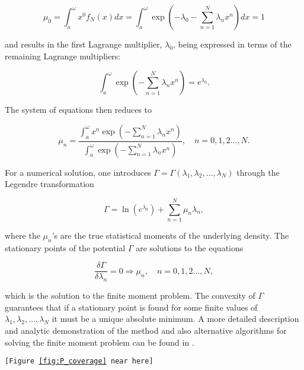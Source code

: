 \documentclass[T0_MEM]{subfiles}
\begin{document}
\begin{equation}
\mu_0 =
\int_{a}^{\omega} x^0 f_N(x) dx =
\int_{a}^{\omega} \exp\left(-\lambda_0 - \sum_{n=1}^{N} \lambda_n x^n\right) dx = 1
\end{equation}

and results in the first Lagrange multiplier, $\lambda_0$, being expressed in terms of the remaining Lagrange multipliers:

\begin{equation}
\int_{a}^{\omega} \exp\left(-\sum_{n=1}^{N} \lambda_n x^n\right) = e^{\lambda_0}.
\end{equation}

The system of equations then reduces to

\begin{equation}
\mu_n = \frac{\int_{a}^{\omega} x^n \exp\left(-\sum_{n=1}^{N} \lambda_n x^n\right)}{
\int_{a}^{\omega} \exp\left(-\sum_{n=1}^{N} \lambda_n x^n\right)},
\quad n = 0, 1, 2 \dots, N.
\end{equation}

For a numerical solution, one introduces $\Gamma = \Gamma(\lambda_1, \lambda_2, \dots, \lambda_N)$ through the Legendre transformation

\begin{equation}
\Gamma = \ln (e^{\lambda_0}) + \sum_{n=1}^{N} \mu_n \lambda_n,
\end{equation}

where the $\mu_n$'s are the true statistical moments of the underlying density. The stationary points of the potential $\Gamma$ are solutions to the equations

\begin{equation}
\frac{\delta\Gamma}{\delta\lambda_n} = 0 \Longrightarrow \mu_n , \quad n = 0, 1, 2 \dots, N,
\end{equation}

which is the solution to the finite moment problem. The convexity of $\Gamma$ guarantees that if a stationary point is found for some finite values of $\lambda_1, \lambda_2, \dots, \lambda_N$ it must be a unique absolute minimum. A more detailed description and analytic demonstration of the method and also alternative algorithms for solving the finite moment problem can be found in \cite{mead1984}.

\begin{center}\texttt{[Figure \ref{fig:P_coverage} near here]}\end{center}
\end{document}
